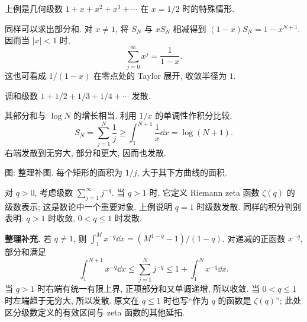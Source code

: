 \begin{example}\label{ex:geometric}
上例是几何级数 $1+x+x^2+x^3+\cdots$ 在 $x=1/2$ 时的特殊情形.
\end{example}
\begin{solution}
同样可以求出部分和. 对 $x\neq1$, 将 $S_N$ 与 $xS_N$ 相减得到 $(1-x)S_N=1-x^{N+1}$. 因而当 $|x|<1$ 时,
\[
\sum_{j=0}^{\infty}x^j=\frac{1}{1-x}.
\]
这也可看成 $1/(1-x)$ 在零点处的 Taylor 展开, 收敛半径为 $1$.
\end{solution}

\begin{example}\label{ex:harmonic}
调和级数 $1+1/2+1/3+1/4+\cdots$ 发散.
\end{example}
\begin{solution}
其部分和与 $\log N$ 的增长相当. 利用 $1/x$ 的单调性作积分比较,
\[
S_N=\sum_{j=1}^{N}\frac1j\geq\int_1^{N+1}\frac1x\dd x=\log(N+1).
\]
右端发散到无穷大, 部分和更大, 因而也发散.
\end{solution}

\begin{center}
\par 图: 整理补图. 每个矩形的面积为 $1/j$, 大于其下方曲线的面积.
\end{center}

\begin{example}\label{ex:p-series}
对 $q>0$, 考虑级数 $\sum_{j=1}^{\infty}j^{-q}$. 当 $q>1$ 时, 它定义 Riemann zeta 函数 $\zeta(q)$ 的级数表示; 这是数论中一个重要对象. 上例说明 $q=1$ 时级数发散. 同样的积分判别表明: $q>1$ 时收敛, $0<q\leq1$ 时发散.
\end{example}
\begin{solution}
\textbf{整理补充.} 若 $q\neq1$, 则 $\int_1^M x^{-q}\dd x=(M^{1-q}-1)/(1-q)$. 对递减的正函数 $x^{-q}$, 部分和满足
\[
\int_1^{N+1}x^{-q}\dd x\leq\sum_{j=1}^{N}j^{-q}\leq1+\int_1^N x^{-q}\dd x.
\]
当 $q>1$ 时右端有统一有限上界, 正项部分和又单调递增, 所以收敛. 当 $0<q\leq1$ 时左端趋于无穷大, 所以发散. 原文在 $q\leq1$ 时也写“作为 $q$ 的函数是 $\zeta(q)$”; 此处区分级数定义的有效区间与 zeta 函数的其他延拓.
\end{solution}

